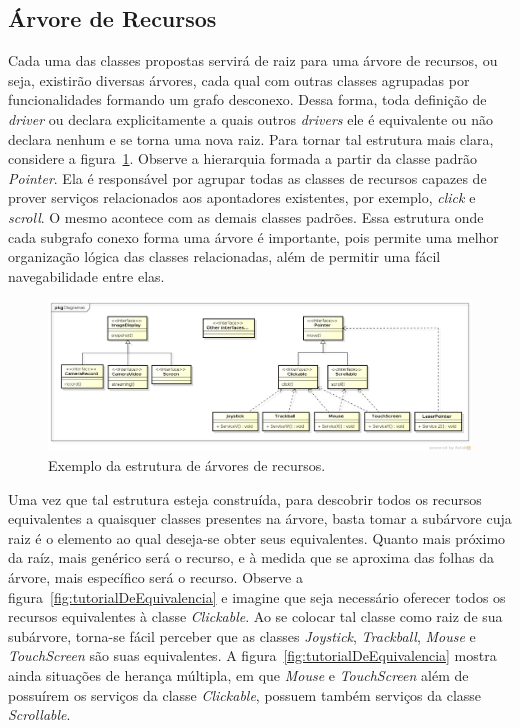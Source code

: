 \subsection{Árvore de Recursos}

Cada uma das classes propostas servirá de raiz para uma árvore de recursos, ou seja, existirão diversas árvores, cada qual com outras classes agrupadas por funcionalidades formando um grafo desconexo. Dessa forma, toda definição de \emph{driver} ou declara explicitamente a quais outros \emph{drivers} ele é equivalente ou não declara nenhum e se torna uma nova raiz. Para tornar tal estrutura mais clara, considere a figura~\ref{fig:arvoreDeRecursos}. Observe a hierarquia formada a partir da classe padrão \emph{Pointer}. Ela é responsável por agrupar todas as classes de recursos capazes de prover serviços relacionados aos apontadores existentes, por exemplo, \emph{click} e \emph{scroll}. O mesmo acontece com as demais classes padrões. Essa estrutura onde cada subgrafo conexo forma uma árvore é importante, pois permite uma melhor organização lógica das classes relacionadas, além de permitir uma fácil navegabilidade entre elas.

\begin{figure}[ht]
	\center
	\includegraphics[scale=0.35]{imagens/hierarquiaDeRecursos}
	\caption{Exemplo da estrutura de árvores de recursos.}
	\label{fig:arvoreDeRecursos}
\end{figure}

Uma vez que tal estrutura esteja construída, para descobrir todos os recursos equivalentes a quaisquer classes presentes na árvore, basta tomar a subárvore cuja raiz é o elemento ao qual deseja-se obter seus equivalentes. Quanto mais próximo da raíz, mais genérico será o recurso, e à medida que se aproxima das folhas da árvore, mais específico será o recurso. Observe a figura~\ref{fig:tutorialDeEquivalencia} e imagine que seja necessário oferecer todos os recursos equivalentes à classe \emph{Clickable}. Ao se colocar tal classe como raiz de sua subárvore, torna-se fácil perceber que as classes \emph{Joystick}, \emph{Trackball}, \emph{Mouse} e \emph{TouchScreen} são suas equivalentes. A figura~\ref{fig:tutorialDeEquivalencia} mostra ainda situações de herança múltipla, em que \emph{Mouse} e \emph{TouchScreen} além de possuírem os serviços da classe \emph{Clickable}, possuem também serviços da classe \emph{Scrollable}.

